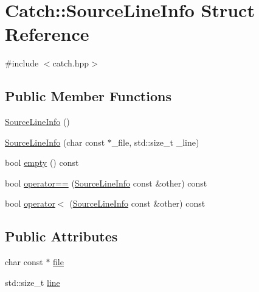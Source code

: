 \hypertarget{structCatch_1_1SourceLineInfo}{\section{Catch\-:\-:Source\-Line\-Info Struct Reference}
\label{structCatch_1_1SourceLineInfo}
}


{\ttfamily \#include $<$catch.\-hpp$>$}

\subsection*{Public Member Functions}
\begin{DoxyCompactItemize}
\item 
\hyperlink{structCatch_1_1SourceLineInfo_a9d44b2e1133794eee0bd5716424c83d6}{Source\-Line\-Info} ()
\item 
\hyperlink{structCatch_1_1SourceLineInfo_a6218cb890337d37f708ea94063958940}{Source\-Line\-Info} (char const $\ast$\-\_\-file, std\-::size\-\_\-t \-\_\-line)
\item 
bool \hyperlink{structCatch_1_1SourceLineInfo_a9a25ffc0640d1a3dd0c9b7e5fcbba7b9}{empty} () const 
\item 
bool \hyperlink{structCatch_1_1SourceLineInfo_af0854821b1abfda52796ef0f1294b050}{operator==} (\hyperlink{structCatch_1_1SourceLineInfo}{Source\-Line\-Info} const \&other) const 
\item 
bool \hyperlink{structCatch_1_1SourceLineInfo_a581c02d683808232168bfc2e775c3554}{operator$<$} (\hyperlink{structCatch_1_1SourceLineInfo}{Source\-Line\-Info} const \&other) const 
\end{DoxyCompactItemize}
\subsection*{Public Attributes}
\begin{DoxyCompactItemize}
\item 
char const $\ast$ \hyperlink{structCatch_1_1SourceLineInfo_ad65537703e9f08c1fa7777fbc3f0c617}{file}
\item 
std\-::size\-\_\-t \hyperlink{structCatch_1_1SourceLineInfo_a841e5d696c7b9cde24e45e61dd979c77}{line}
\end{DoxyCompactItemize}


